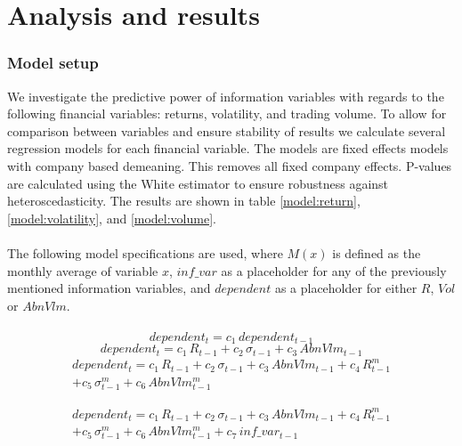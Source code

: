 
\chapter{Analysis and results}
\subsection{Model setup}
We investigate the predictive power of information variables with regards to the following financial variables: returns, volatility, and trading volume. To allow for comparison between variables and ensure stability of results we calculate several regression models for each financial variable. The models are fixed effects models with company based demeaning. This removes all fixed company effects. P-values are calculated using the White estimator to ensure robustness against heteroscedasticity. The results are shown in table \ref{model:return}, \ref{model:volatility}, and \ref{model:volume}.
\\\\
The following model specifications are used, where $M(x)$ is defined as the monthly average of variable $x$, $inf\_var$ as a placeholder for any of the previously mentioned information variables, and $dependent$ as a placeholder for either $R$, $Vol$ or $AbnVlm$.
\\\\
\begin{equation}
    dependent_t = c_1\,dependent_{t-1}
\end{equation}
\begin{equation}
    dependent_t = c_1\,R_{t-1}+c_2\,\sigma_{t-1}+c_3\,AbnVlm_{t-1}
\end{equation}
\begin{equation}
\begin{split}
    dependent_t = c_1\,R_{t-1}+c_2\,\sigma_{t-1}+c_3\,AbnVlm_{t-1}+c_4\,R_{t-1}^m\\
    +c_5\,\sigma_{t-1}^m+c_6\,AbnVlm_{t-1}^m
\end{split}
\end{equation}

\begin{equation}
\begin{split}
    dependent_t = c_1\,R_{t-1}+c_2\,\sigma_{t-1}+c_3\,AbnVlm_{t-1}+c_4\,R_{t-1}^m\\
    +c_5\,\sigma_{t-1}^m+c_6\,AbnVlm_{t-1}^m+c_7\,inf\_var_{t-1}
\end{split}
\end{equation}


